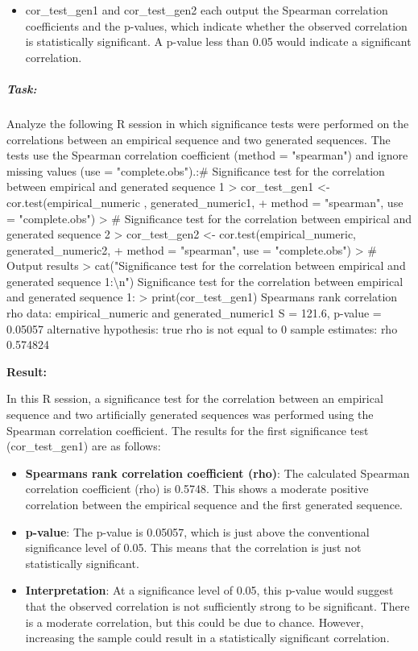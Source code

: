 \documentclass[
]{article}
\begin{document}
\begin{itemize}
\item
  cor\_test\_gen1 and cor\_test\_gen2 each output the Spearman
  correlation coefficients and the p-values, which indicate whether the
  observed correlation is statistically significant. A p-value less than
  0.05 would indicate a significant correlation.
\end{itemize}

\subparagraph{\texorpdfstring{ \textbf{Task:}}{ Task:}}\label{task-4}

Analyze the following R session in which significance tests were
performed on the correlations between an empirical sequence and two
generated sequences. The tests use the Spearman correlation coefficient
(method = "spearman") and ignore missing values
\hspace{0pt}\hspace{0pt}(use = "complete.obs").:\textquotesingle\#
Significance test for the correlation between empirical and generated
sequence 1 \textgreater{} cor\_test\_gen1 \textless-
cor.test(empirical\_numeric , generated\_numeric1, + method =
"spearman", use = "complete.obs") \textgreater{} \# Significance test
for the correlation between empirical and generated sequence 2
\textgreater{} cor\_test\_gen2 \textless- cor.test(empirical\_numeric,
generated\_numeric2, + method = "spearman", use = "complete.obs")
\textgreater{} \# Output results \textgreater{} cat("Significance test
for the correlation between empirical and generated sequence
1:\textbackslash n") Significance test for the correlation between
empirical and generated sequence 1: \textgreater{}
print(cor\_test\_gen1) Spearman\textquotesingle s rank correlation rho
data: empirical\_numeric and generated\_numeric1 S = 121.6, p-value =
0.05057 alternative hypothesis: true rho is not equal to 0 sample
estimates: rho 0.574824 \textquotesingle{}

\textbf{Result:}

In this R session, a significance test for the correlation between an
empirical sequence and two artificially generated sequences was
performed using the Spearman correlation coefficient. The results for
the first significance test (cor\_test\_gen1) are as follows:

\begin{itemize}
\item
  \textbf{Spearman\textquotesingle s rank correlation coefficient
  (rho)}: The calculated Spearman correlation coefficient (rho) is
  0.5748. This shows a moderate positive correlation between the
  empirical sequence and the first generated sequence.
\item
  \textbf{p-value}: The p-value is 0.05057, which is just above the
  conventional significance level of 0.05. This means that the
  correlation is just not statistically significant.
\item
  \textbf{Interpretation}: At a significance level of 0.05, this p-value
  would suggest that the observed correlation is not sufficiently strong
  to be significant. There is a moderate correlation, but this could be
  due to chance. However, increasing the sample could result in a
  statistically significant correlation.
\end{itemize}
\end{document}
